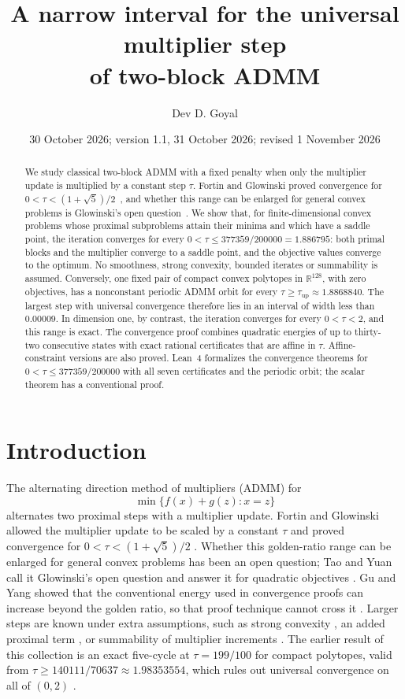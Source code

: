 \documentclass[11pt]{article}
\title{A narrow interval for the universal multiplier step\\ of two-block ADMM}
\author{Dev D. Goyal}
\date{30 October 2026; version 1.1, 31 October 2026; revised 1 November 2026}
\numberwithin{equation}{section}
\theoremstyle{definition}
\theoremstyle{remark}
\newcommand{\R}{\mathbb R}
\newcommand{\taunew}{377359/200000}
\newcommand{\tauup}{\tau_{\mathrm{up}}}
\begin{document}
\maketitle

\begin{abstract}
We study classical two-block ADMM with a fixed penalty when only the multiplier update is multiplied by a constant step $\tau$. Fortin and Glowinski proved convergence for $0<\tau<(1+\sqrt5)/2$~\cite{FortinGlowinski}, and whether this range can be enlarged for general convex problems is Glowinski's open question~\cite{TaoYuan}. We show that, for finite-dimensional convex problems whose proximal subproblems attain their minima and which have a saddle point, the iteration converges for every $0<\tau\le \taunew=1.886795$: both primal blocks and the multiplier converge to a saddle point, and the objective values converge to the optimum. No smoothness, strong convexity, bounded iterates or summability is assumed. Conversely, one fixed pair of compact convex polytopes in $\R^{128}$, with zero objectives, has a nonconstant periodic ADMM orbit for every $\tau\ge\tauup\approx1.8868840$. The largest step with universal convergence therefore lies in an interval of width less than $0.00009$. In dimension one, by contrast, the iteration converges for every $0<\tau<2$, and this range is exact. The convergence proof combines quadratic energies of up to thirty-two consecutive states with exact rational certificates that are affine in $\tau$. Affine-constraint versions are also proved. Lean~4 formalizes the convergence theorems for $0<\tau\le\taunew$ with all seven certificates and the periodic orbit; the scalar theorem has a conventional proof.
\end{abstract}

\tableofcontents

\section{Introduction}
The alternating direction method of multipliers (ADMM) for
\[
\min\{f(x)+g(z): x=z\}
\]
alternates two proximal steps with a multiplier update. Fortin and Glowinski allowed the multiplier update to be scaled by a constant $\tau$ and proved convergence for $0<\tau<(1+\sqrt5)/2$ \cite{FortinGlowinski}. Whether this golden-ratio range can be enlarged for general convex problems has been an open question; Tao and Yuan call it Glowinski's open question and answer it for quadratic objectives \cite{TaoYuan}. Gu and Yang showed that the conventional energy used in convergence proofs can increase beyond the golden ratio, so that proof technique cannot cross it \cite{GuYang}. Larger steps are known under extra assumptions, such as strong convexity \cite{MaShuLiWu}, an added proximal term \cite{Ma2020}, or summability of multiplier increments \cite{ChenSunToh}. The earlier result of this collection is an exact five-cycle at $\tau=199/100$ for compact polytopes, valid from $\tau\ge140111/70637\approx1.98353554$, which rules out universal convergence on all of $(0,2)$ \cite{FiveCycle}.
\end{document}
